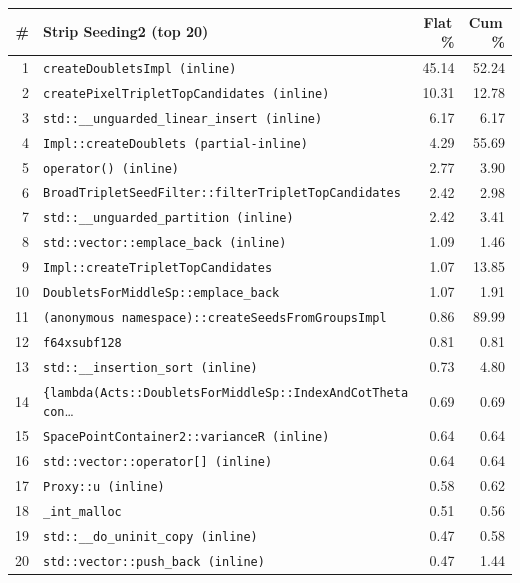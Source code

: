 \begin{tabular}{rlrr}
\toprule
\textbf{\#} & \textbf{Strip Seeding2 (top 20)} & \textbf{Flat\,\%} & \textbf{Cum\,\%} \\
\midrule
1 & \texttt{createDoubletsImpl (inline)} & 45.14 & 52.24 \\
2 & \texttt{createPixelTripletTopCandidates (inline)} & 10.31 & 12.78 \\
3 & \texttt{std::\_\_unguarded\_linear\_insert (inline)} & 6.17 & 6.17 \\
4 & \texttt{Impl::createDoublets (partial-inline)} & 4.29 & 55.69 \\
5 & \texttt{operator() (inline)} & 2.77 & 3.90 \\
6 & \texttt{BroadTripletSeedFilter::filterTripletTopCandidates} & 2.42 & 2.98 \\
7 & \texttt{std::\_\_unguarded\_partition (inline)} & 2.42 & 3.41 \\
8 & \texttt{std::vector::emplace\_back (inline)} & 1.09 & 1.46 \\
9 & \texttt{Impl::createTripletTopCandidates} & 1.07 & 13.85 \\
10 & \texttt{DoubletsForMiddleSp::emplace\_back} & 1.07 & 1.91 \\
11 & \texttt{(anonymous namespace)::createSeedsFromGroupsImpl} & 0.86 & 89.99 \\
12 & \texttt{f64xsubf128} & 0.81 & 0.81 \\
13 & \texttt{std::\_\_insertion\_sort (inline)} & 0.73 & 4.80 \\
14 & \texttt{\{lambda(Acts::DoubletsForMiddleSp::IndexAndCotTheta con}\ldots & 0.69 & 0.69 \\
15 & \texttt{SpacePointContainer2::varianceR (inline)} & 0.64 & 0.64 \\
16 & \texttt{std::vector::operator[] (inline)} & 0.64 & 0.64 \\
17 & \texttt{Proxy::u (inline)} & 0.58 & 0.62 \\
18 & \texttt{\_int\_malloc} & 0.51 & 0.56 \\
19 & \texttt{std::\_\_do\_uninit\_copy (inline)} & 0.47 & 0.58 \\
20 & \texttt{std::vector::push\_back (inline)} & 0.47 & 1.44 \\
\bottomrule
\end{tabular}
